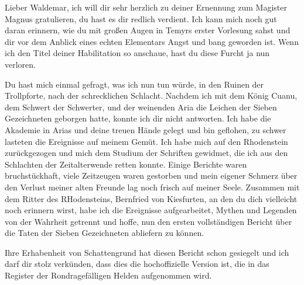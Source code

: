 Lieber Waldemar,
ich will dir sehr herzlich zu deiner Ernennung zum Magister Magnus gratulieren, du hast es dir redlich verdient. Ich kann mich noch gut daran erinnern, wie du mit großen Augen in Temyrs erster Vorlesung sahst und dir vor dem Anblick eines echten Elementars Angst und bang geworden ist. Wenn ich den Titel deiner Habilitation so anschaue, hast du diese Furcht ja nun verloren.\par\medskip
Du hast mich einmal gefragt, was ich nun tun würde, in den Ruinen der Trollpforte, nach der schrecklichen Schlacht. Nachdem ich mit dem König Cuanu, dem Schwert der Schwerter, und der weinenden Aria die Leichen der Sieben Gezeichneten geborgen hatte, konnte ich dir nicht antworten. Ich habe die Akademie in Arias und deine treuen Hände gelegt und bin geflohen, zu schwer lasteten die Ereignisse auf meinem Gemüt. Ich habe mich auf den Rhodenstein zurückgezogen und mich dem Studium der Schriften gewidmet, die ich aus den Schlachten der Zeitalterwende retten konnte. Einige Berichte waren bruchstückhaft, viele Zeitzeugen waren gestorben und mein eigener Schmerz über den Verlust meiner alten Freunde lag noch frisch auf meiner Seele. Zusammen mit dem Ritter des RHodensteins, Bernfried von Kiesfurten, an den du dich vielleicht noch erinnern wirst, habe ich die Ereignisse aufgearbeitet, Mythen und Legenden von der Wahrheit getrennt und hoffe, nun den ersten vollständigen Bericht über die Taten der Sieben Gezeichneten abliefern zu können.\par\medskip
Ihre Erhabenheit von Schattengrund hat diesen Bericht schon gesiegelt und ich darf dir stolz verkünden, dass dies die hochoffizielle Version ist, die in das Register der Rondragefälligen Helden aufgenommen wird.\par\medskip

